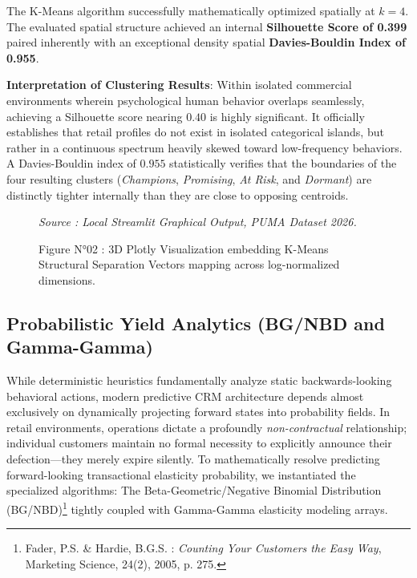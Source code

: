 \documentclass[12pt,a4paper]{report}
\begin{document}
The K-Means algorithm successfully mathematically optimized spatially at \textbf{$k=4$}. The evaluated spatial structure achieved an internal \textbf{Silhouette Score of 0.399} paired inherently with an exceptional density spatial \textbf{Davies-Bouldin Index of 0.955}. 

\textbf{Interpretation of Clustering Results}: Within isolated commercial environments wherein psychological human behavior overlaps seamlessly, achieving a Silhouette score nearing $0.40$ is highly significant. It officially establishes that retail profiles do not exist in isolated categorical islands, but rather in a continuous spectrum heavily skewed toward low-frequency behaviors. A Davies-Bouldin index of $0.955$ statistically verifies that the boundaries of the four resulting clusters (\textit{Champions}, \textit{Promising}, \textit{At Risk}, and \textit{Dormant}) are distinctly tighter internally than they are close to opposing centroids.

\begin{figure}[H]
    \centering
    \vspace{4cm} 
    \caption{Figure N°02 : 3D Plotly Visualization embedding K-Means Structural Separation Vectors mapping across log-normalized dimensions.}
    \vspace{0.2cm}
    \footnotesize{\textit{Source : Local Streamlit Graphical Output, PUMA Dataset 2026.}}
    \label{fig:kmeans_3d}
\end{figure}

\subsection{Probabilistic Yield Analytics (BG/NBD and Gamma-Gamma)}
While deterministic heuristics fundamentally analyze static backwards-looking behavioral actions, modern predictive CRM architecture depends almost exclusively on dynamically projecting forward states into probability fields. In retail environments, operations dictate a profoundly \textit{non-contractual} relationship; individual customers maintain no formal necessity to explicitly announce their defection—they merely expire silently. To mathematically resolve predicting forward-looking transactional elasticity probability, we instantiated the specialized algorithms: The Beta-Geometric/Negative Binomial Distribution (BG/NBD)\footnote{Fader, P.S. \& Hardie, B.G.S. : \textit{Counting Your Customers the Easy Way}, Marketing Science, 24(2), 2005, p. 275.} tightly coupled with Gamma-Gamma elasticity modeling arrays.
\end{document}
